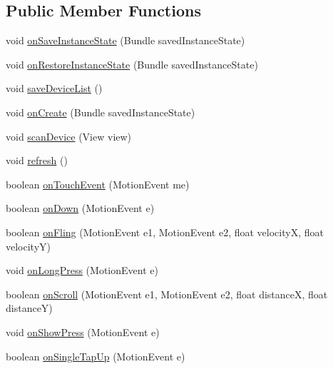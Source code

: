 \subsection*{\-Public \-Member \-Functions}
\begin{DoxyCompactItemize}
\item 
void \hyperlink{classcom_1_1axcoto_1_1shinjuku_1_1sushi_1_1_device_activity_a6992969459b5fc776a9d595a5aa7e7e6}{on\-Save\-Instance\-State} (\-Bundle saved\-Instance\-State)
\item 
void \hyperlink{classcom_1_1axcoto_1_1shinjuku_1_1sushi_1_1_device_activity_a3fd108ef7b3bf7c29e53e6c4984d5f84}{on\-Restore\-Instance\-State} (\-Bundle saved\-Instance\-State)
\item 
void \hyperlink{classcom_1_1axcoto_1_1shinjuku_1_1sushi_1_1_device_activity_a474cd371b3913797ee9439ebc567c219}{save\-Device\-List} ()
\item 
void \hyperlink{classcom_1_1axcoto_1_1shinjuku_1_1sushi_1_1_device_activity_a85e87cb5ced88dff7c8173ecc4f636d1}{on\-Create} (\-Bundle saved\-Instance\-State)
\item 
void \hyperlink{classcom_1_1axcoto_1_1shinjuku_1_1sushi_1_1_device_activity_aedac3a1961a15d78dbf608505a6c0e11}{scan\-Device} (\-View view)
\item 
void \hyperlink{classcom_1_1axcoto_1_1shinjuku_1_1sushi_1_1_device_activity_a5f2e190b8261a98c97c2ea4e86670d54}{refresh} ()
\item 
boolean \hyperlink{classcom_1_1axcoto_1_1shinjuku_1_1sushi_1_1_device_activity_a316e2162aee3b81438c6f324cadbfd4e}{on\-Touch\-Event} (\-Motion\-Event me)
\item 
boolean \hyperlink{classcom_1_1axcoto_1_1shinjuku_1_1sushi_1_1_device_activity_afe7febda1f2210be8658c06fce770e1c}{on\-Down} (\-Motion\-Event e)
\item 
boolean \hyperlink{classcom_1_1axcoto_1_1shinjuku_1_1sushi_1_1_device_activity_ae44fb084c2495a486a664f60ae319b8c}{on\-Fling} (\-Motion\-Event e1, \-Motion\-Event e2, float velocity\-X, float velocity\-Y)
\item 
void \hyperlink{classcom_1_1axcoto_1_1shinjuku_1_1sushi_1_1_device_activity_ac12f39cb7fd9003b2aa5ddf76f2e93fe}{on\-Long\-Press} (\-Motion\-Event e)
\item 
boolean \hyperlink{classcom_1_1axcoto_1_1shinjuku_1_1sushi_1_1_device_activity_af912304fa5a847e1231b71015c2ed06a}{on\-Scroll} (\-Motion\-Event e1, \-Motion\-Event e2, float distance\-X, float distance\-Y)
\item 
void \hyperlink{classcom_1_1axcoto_1_1shinjuku_1_1sushi_1_1_device_activity_a929cec72582aad79985fd2927344b9c7}{on\-Show\-Press} (\-Motion\-Event e)
\item 
boolean \hyperlink{classcom_1_1axcoto_1_1shinjuku_1_1sushi_1_1_device_activity_a05333c5dbd12d347d100d8cb029e4530}{on\-Single\-Tap\-Up} (\-Motion\-Event e)
\end{DoxyCompactItemize}
